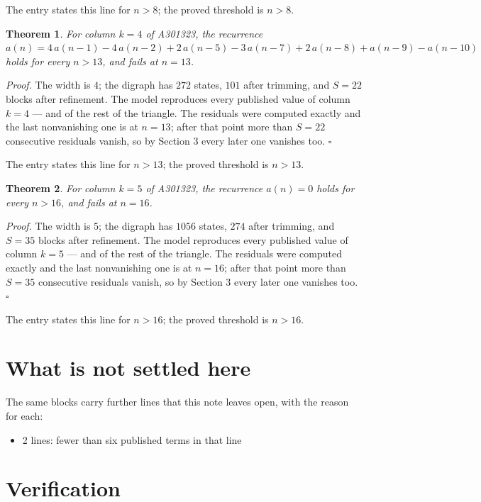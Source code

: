 \documentclass[11pt]{article}
\newtheorem{theorem}{Theorem}
\theoremstyle{definition}
\begin{document}
The entry states this line for $n > 8$; the proved threshold is $n > 8$.

\begin{theorem} For column $k = 4$ of A301323, the recurrence $a(n) = 4\,a(n-1) - 4\,a(n-2) + 2\,a(n-5) - 3\,a(n-7) + 2\,a(n-8) + a(n-9) - a(n-10)$ holds for every $n > 13$, and fails at $n = 13$.\end{theorem}

{\itshape Proof.} The width is $4$; the digraph has $272$ states, $101$ after trimming, and $S = 22$ blocks after refinement. The model reproduces every published value of column $k = 4$ --- and of the rest of the triangle. The residuals were computed exactly and the last nonvanishing one is at $n = 13$; after that point more than $S = 22$ consecutive residuals vanish, so by Section 3 every later one vanishes too. $\square$

The entry states this line for $n > 13$; the proved threshold is $n > 13$.

\begin{theorem} For column $k = 5$ of A301323, the recurrence $a(n) = 0$ holds for every $n > 16$, and fails at $n = 16$.\end{theorem}

{\itshape Proof.} The width is $5$; the digraph has $1056$ states, $274$ after trimming, and $S = 35$ blocks after refinement. The model reproduces every published value of column $k = 5$ --- and of the rest of the triangle. The residuals were computed exactly and the last nonvanishing one is at $n = 16$; after that point more than $S = 35$ consecutive residuals vanish, so by Section 3 every later one vanishes too. $\square$

The entry states this line for $n > 16$; the proved threshold is $n > 16$.

\section{What is not settled here}

The same blocks carry further lines that this note leaves open, with the reason for each:

\begin{itemize}

\item 2 lines: fewer than six published terms in that line

\end{itemize}

\section{Verification}
\end{document}
